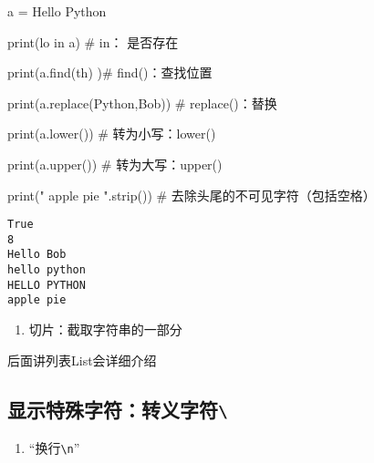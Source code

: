 \documentclass[
  letterpaper,
  DIV=11,
  numbers=noendperiod]{scrreprt}
\newenvironment{Shaded}{\begin{snugshade}}{\end{snugshade}}
\newcommand{\BuiltInTok}[1]{\textcolor[rgb]{0.00,0.23,0.31}{#1}}
\newcommand{\CommentTok}[1]{\textcolor[rgb]{0.37,0.37,0.37}{#1}}
\newcommand{\KeywordTok}[1]{\textcolor[rgb]{0.00,0.23,0.31}{#1}}
\newcommand{\NormalTok}[1]{\textcolor[rgb]{0.00,0.23,0.31}{#1}}
\newcommand{\OperatorTok}[1]{\textcolor[rgb]{0.37,0.37,0.37}{#1}}
\newcommand{\StringTok}[1]{\textcolor[rgb]{0.13,0.47,0.30}{#1}}
\providecommand{\tightlist}{%
  \setlength{\itemsep}{0pt}\setlength{\parskip}{0pt}}\usepackage{longtable,booktabs,array}
\begin{document}
\begin{Shaded}
\begin{Highlighting}[]
\NormalTok{a }\OperatorTok{=} \StringTok{\textquotesingle{}Hello Python\textquotesingle{}}

\BuiltInTok{print}\NormalTok{(}\StringTok{\textquotesingle{}lo\textquotesingle{}} \KeywordTok{in}\NormalTok{ a) }\CommentTok{\# in： 是否存在}

\BuiltInTok{print}\NormalTok{(a.find(}\StringTok{\textquotesingle{}th\textquotesingle{}}\NormalTok{) )}\CommentTok{\# find()：查找位置}

\BuiltInTok{print}\NormalTok{(a.replace(}\StringTok{\textquotesingle{}Python\textquotesingle{}}\NormalTok{,}\StringTok{\textquotesingle{}Bob\textquotesingle{}}\NormalTok{)) }\CommentTok{\# replace()：替换}

\BuiltInTok{print}\NormalTok{(a.lower()) }\CommentTok{\# 转为小写：lower()}

\BuiltInTok{print}\NormalTok{(a.upper()) }\CommentTok{\# 转为大写：upper()}

\BuiltInTok{print}\NormalTok{(}\StringTok{" apple pie "}\NormalTok{.strip()) }\CommentTok{\# 去除头尾的不可见字符（包括空格）}
\end{Highlighting}
\end{Shaded}

\begin{verbatim}
True
8
Hello Bob
hello python
HELLO PYTHON
apple pie
\end{verbatim}

\begin{enumerate}
\def\labelenumi{\arabic{enumi}.}
\setcounter{enumi}{2}
\tightlist
\item
  切片：截取字符串的一部分
\end{enumerate}

后面讲列表List会详细介绍

\hypertarget{ux663eux793aux7279ux6b8aux5b57ux7b26ux8f6cux4e49ux5b57ux7b26}{%
\subsection{\texorpdfstring{显示特殊字符：转义字符\texttt{\textbackslash{}}}{显示特殊字符：转义字符\textbackslash{}}}\label{ux663eux793aux7279ux6b8aux5b57ux7b26ux8f6cux4e49ux5b57ux7b26}}

\begin{enumerate}
\def\labelenumi{\arabic{enumi}.}
\tightlist
\item
  ``换行\texttt{\textbackslash{}n}''
\end{enumerate}
\end{document}
